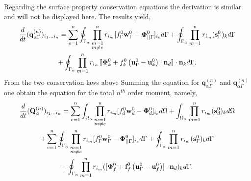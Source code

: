 Regarding the surface property conservation equations the derivation is similar and will not be displayed here. 
The results yield, 
\begin{multline}
    \ddt {(\textbf{q}_{\alpha\Gamma}^{(n)})_{i_1\ldots i_n}}
    = \sum_{e=1}^{n} 
    \intS{
        \prod^{n}_{\substack{ m=1 \\m \neq e}} r_{i_m} [f_\Gamma^0\textbf{w}_\Gamma^0 - \bm\Phi_{||\Gamma}^0]_{i_e}
    }
    + \intS{ \pri{1}{n} (\textbf{s}_\Gamma^0)_k }
    \\
    +\intS{ \pri{1}{n} \Jump{\bm\Phi_k^0 + f_k^0 \left(\textbf{u}_\Gamma^0 - \textbf{u}_k^0\right)\cdot \textbf{n}_d}}.
    \label{eq:dt_Qgamma_n}
\end{multline}
From the two conservation laws above 
Summing the equation for $\textbf{q}_{\alpha\Gamma}^{(n)}$ and $\textbf{q}_{\alpha\Gamma}^{(n)}$ one obtain the equation for the total $n^{th}$ order moment,  namely, 
\begin{multline}
    \ddt {(\textbf{Q}_{\alpha}^{(n)})_{i_1\ldots i_n}}
    = 
    \sum_{e=1}^{n} 
    \intO{
        \prod^{n}_{\substack{ m=1 \\m \neq e}} r_{i_m} [f_d^0\textbf{w}_d^0  - \bm\Phi_d^0]_{i_e}
    }
    + \intO{ \pri{1}{n} (\textbf{s}_d^0)_k }\\
    +     
    \sum_{e=1}^{n} 
    \intS{
        \prod^{n}_{\substack{ m=1 \\m \neq e}} r_{i_m} [f_\Gamma^0\textbf{w}_\Gamma^0 - \bm\Phi_{||\Gamma}^0]_{i_e}
    }
    + \intS{ \pri{1}{n} (\textbf{s}_\Gamma^0)_k }
    \\
    +\intS{ \pri{1}{n} ([\bm\Phi_f^0 + \textbf{f}_f^0 \left(\textbf{u}_\Gamma^0 - \textbf{u}_f^0\right)]\cdot \textbf{n}_d)_k }. 
    \label{eq:dt_Q_n}
\end{multline}


